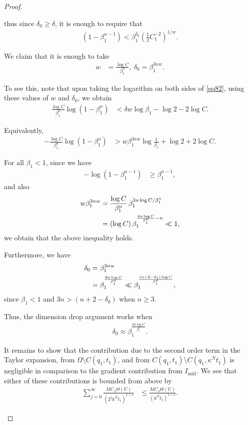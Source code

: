 \documentclass{article}
\theoremstyle{plain}
\theoremstyle{plain}
\newcommand{\thee}{\Theta(U)}
\theoremstyle{definition}
\theoremstyle{plain}
\begin{document}
\begin{proof}
\begin{itemize}
thus since $\delta_0\geq \delta$, it is enough to require that 
\begin{align}
    (1-\beta_1^{n-1}) < \beta_1^{\delta_0} \left(\frac{1}{2}C_{1}^{-2}\right)^{1/w}.
\end{align}

We claim that it is enough to take
\begin{align}
w &= \frac{\log C}{\beta_1^n}, \ \delta_0 = \beta_1^{3nw}.
\end{align}

To see this, note that upon taking the logarithm on both sides of \eqref{eq82}, 
using these values of $w$ and $\delta_0$, we obtain
\begin{align}
\frac{\log C}{\beta_1^n} \log(1-\beta_1^n)
&< \delta w \log \beta_1 - \log 2 - 2\log C .
\end{align}

Equivalently,
\begin{align}
-\frac{\log C}{\beta_1^n} \log(1-\beta_1^n)
&> w \beta_1^{3nw} \log \frac{1}{\beta_1} + \log 2 + 2\log C .
\end{align}

For all $\beta_1<1$, since we have
\begin{align}
-\log(1-\beta_1^{n-1}) &\ge \beta_1^{n-1},
\end{align}
and also
\begin{align}
w\beta_1^{3nw}
&= \frac{\log C}{\beta_1^n}\,\beta_1^{3n\log C/\beta_1^n} \notag\\
&= (\log C)\,\beta_1^{\frac{4n\log C}{\beta_1^n}-n}
\ll 1,
\end{align}
we obtain that the above inequality holds.

Furthermore, we have
\begin{align}
\delta_0
&= \beta_1^{3nw} \notag\\
&= \beta_1^{\frac{3n\log C}{\beta_1^n}}
\ll \beta_1^{\frac{(n+2-\delta_1)\log C}{\beta_1^n}},
\end{align}
since $\beta_1<1$ and $3n > (n+2-\delta_0)$ when $n\geq 3$.

Thus, the dimension drop argument works when
\begin{align}\label{impparameter}
\delta_0 \approx \beta_1^{\frac{3n\log C}{\beta_1^n}}.
\end{align}

It remains to show that the contribution due to the second order term
in the Taylor expansion, from $\Omega\setminus C(q_1, t_1)$, and from $C(q_1,t_1)\setminus C(q_1,\kappa^{N}t_1)$ 
is negligible in comparison to the gradient contribution from $I_{\text{mid}}$.
We see that either of these contributions is bounded from above by
\begin{align}
\sum_{j=0}^\infty \frac{M C_4 \thee}{(2^j k^N t_1)^{1+\delta}}
&\le
\frac{M C_4 \thee}{(k^N t_1)^{1+\delta}}.
\end{align}


\end{itemize}
\end{proof}
\end{document}
